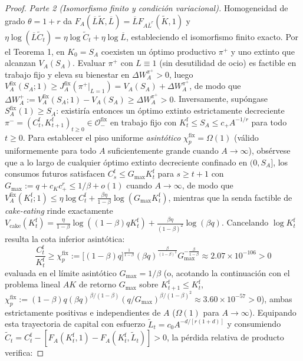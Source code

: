 \documentclass[11pt,letterpaper]{article}
\theoremstyle{plain}
\begin{document}
\begin{proof}
\emph{Parte 2 (Isomorfismo finito y condición variacional).} Homogeneidad de grado $\theta=1+r$ da $F_A(\overline{L}\tilde{K},\overline{L})=\overline{L}F_{A\overline{L}^r}(\tilde{K},1)$ y $\eta\log(\overline{L}\tilde{C}_t)=\eta\log\tilde{C}_t+\eta\log\overline{L}$, estableciendo el isomorfismo finito exacto. Por el Teorema 1, en $K_0=S_A$ coexisten un óptimo productivo $\pi^+$ y uno extinto que alcanzan $V_A(S_A)$. Evaluar $\pi^+$ con $L\equiv 1$ (sin desutilidad de ocio) es factible en trabajo fijo y eleva su bienestar en $\Delta W_A^{\pi^+}>0$, luego $V_A^{\mathrm{fix}}(S_A;1)\ge J_A^{\mathrm{fix}}(\pi^+|_{L=1}) = V_A(S_A)+\Delta W_A^{\pi^+}$, de modo que $\Delta W_A^+ := V_A^{\mathrm{fix}}(S_A;1)-V_A(S_A) \ge \Delta W_A^{\pi^+} > 0$. Inversamente, supóngase $S_A^{\mathrm{fix}}(1)\ge S_A$: existiría entonces un óptimo extinto estrictamente decreciente $\pi^-=(C_t^{\mathrm{f}},K_{t+1}^{\mathrm{f}})_{t\ge 0}\in\mathcal{O}_-^{\mathrm{fix}}$ en trabajo fijo con $K_t^{\mathrm{f}}\le S_A\le c_+ A^{-1/r}$ para todo $t\ge 0$. Para establecer el piso uniforme \emph{asintótico} $\chi_p^{\mathrm{fix}}=\Omega(1)$ (válido uniformemente para todo $A$ suficientemente grande cuando $A\to\infty$), obsérvese que a lo largo de cualquier óptimo extinto decreciente confinado en $(0,S_A]$, los consumos futuros satisfacen $C_s^{\mathrm{f}}\le G_{\max}K_t^{\mathrm{f}}$ para $s\ge t+1$ con $G_{\max}:=q+c_K c_+^r \le 1/\beta + o(1)$ cuando $A\to\infty$, de modo que $V_A^{\mathrm{fix}}(K_t^{\mathrm{f}};1) \le \eta\log C_t^{\mathrm{f}} + \frac{\beta\eta}{1-\beta}\log(G_{\max}K_t^{\mathrm{f}})$, mientras que la senda factible de \emph{cake-eating} rinde exactamente $V_{\mathrm{cake}}(K_t^{\mathrm{f}})=\frac{\eta}{1-\beta}\log((1-\beta)qK_t^{\mathrm{f}})+\frac{\beta\eta}{(1-\beta)^2}\log(\beta q)$. Cancelando $\log K_t^{\mathrm{f}}$ resulta la cota inferior asintótica:
\[
\frac{C_t^{\mathrm{f}}}{K_t^{\mathrm{f}}} \ge \chi_p^{\mathrm{fix}} := \big[(1-\beta)q\big]^{\frac{1}{1-\beta}}(\beta q)^{\frac{\beta}{(1-\beta)^2}} G_{\max}^{-\frac{\beta}{1-\beta}} \approx 2.07\times 10^{-106} > 0
\]
evaluada en el límite asintótico $G_{\max}=1/\beta$ (o, acotando la continuación con el problema lineal $AK$ de retorno $G_{\max}$ sobre $K_{t+1}^{\mathrm{f}}\le K_t^{\mathrm{f}}$, $\chi_p^{\mathrm{fix}} := (1-\beta)q(\beta q)^{\beta/(1-\beta)}(q/G_{\max})^{\beta/(1-\beta)^2}\approx 3.60\times 10^{-57}>0$), ambas estrictamente positivas e independientes de $A$ ($\Omega(1)$ para $A\to\infty$). Equipando esta trayectoria de capital con esfuerzo $\tilde{L}_t = c_0 A^{-d/[r(1+d)]}$ y consumiendo $\tilde{C}_t = C_t^{\mathrm{f}} - [F_A(K_t^{\mathrm{f}},1)-F_A(K_t^{\mathrm{f}},\tilde{L}_t)] > 0$, la pérdida relativa de producto verifica:

\end{proof}
\end{document}
